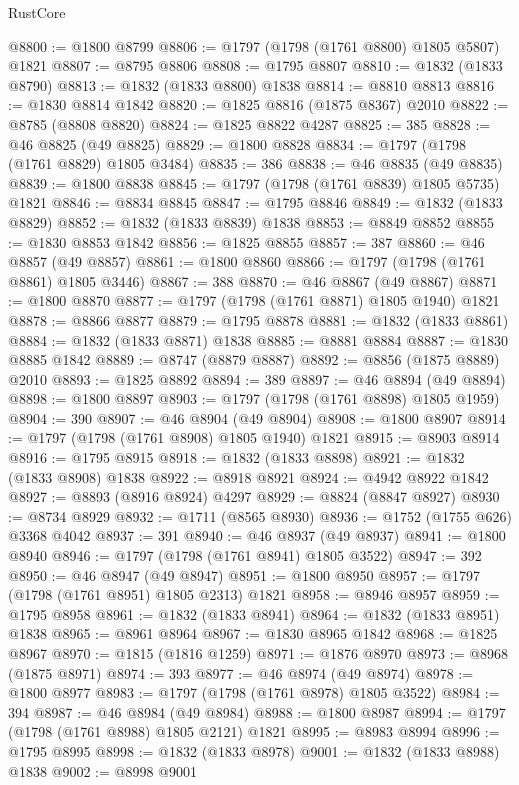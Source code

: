 \begin{lexlean}{RustCore}
\begin{coremodule}
@8800 := @1800 @8799
@8806 := @1797 (@1798 (@1761 @8800) @1805 @5807) @1821
@8807 := @8795 @8806
@8808 := @1795 @8807
@8810 := @1832 (@1833 @8790)
@8813 := @1832 (@1833 @8800) @1838
@8814 := @8810 @8813
@8816 := @1830 @8814 @1842
@8820 := @1825 @8816 (@1875 @8367) @2010
@8822 := @8785 (@8808 @8820)
@8824 := @1825 @8822 @4287
@8825 := 385
@8828 := @46 @8825 (@49 @8825)
@8829 := @1800 @8828
@8834 := @1797 (@1798 (@1761 @8829) @1805 @3484)
@8835 := 386
@8838 := @46 @8835 (@49 @8835)
@8839 := @1800 @8838
@8845 := @1797 (@1798 (@1761 @8839) @1805 @5735) @1821
@8846 := @8834 @8845
@8847 := @1795 @8846
@8849 := @1832 (@1833 @8829)
@8852 := @1832 (@1833 @8839) @1838
@8853 := @8849 @8852
@8855 := @1830 @8853 @1842
@8856 := @1825 @8855
@8857 := 387
@8860 := @46 @8857 (@49 @8857)
@8861 := @1800 @8860
@8866 := @1797 (@1798 (@1761 @8861) @1805 @3446)
@8867 := 388
@8870 := @46 @8867 (@49 @8867)
@8871 := @1800 @8870
@8877 := @1797 (@1798 (@1761 @8871) @1805 @1940) @1821
@8878 := @8866 @8877
@8879 := @1795 @8878
@8881 := @1832 (@1833 @8861)
@8884 := @1832 (@1833 @8871) @1838
@8885 := @8881 @8884
@8887 := @1830 @8885 @1842
@8889 := @8747 (@8879 @8887)
@8892 := @8856 (@1875 @8889) @2010
@8893 := @1825 @8892
@8894 := 389
@8897 := @46 @8894 (@49 @8894)
@8898 := @1800 @8897
@8903 := @1797 (@1798 (@1761 @8898) @1805 @1959)
@8904 := 390
@8907 := @46 @8904 (@49 @8904)
@8908 := @1800 @8907
@8914 := @1797 (@1798 (@1761 @8908) @1805 @1940) @1821
@8915 := @8903 @8914
@8916 := @1795 @8915
@8918 := @1832 (@1833 @8898)
@8921 := @1832 (@1833 @8908) @1838
@8922 := @8918 @8921
@8924 := @4942 @8922 @1842
@8927 := @8893 (@8916 @8924) @4297
@8929 := @8824 (@8847 @8927)
@8930 := @8734 @8929
@8932 := @1711 (@8565 @8930)
@8936 := @1752 (@1755 @626) @3368 @4042
@8937 := 391
@8940 := @46 @8937 (@49 @8937)
@8941 := @1800 @8940
@8946 := @1797 (@1798 (@1761 @8941) @1805 @3522)
@8947 := 392
@8950 := @46 @8947 (@49 @8947)
@8951 := @1800 @8950
@8957 := @1797 (@1798 (@1761 @8951) @1805 @2313) @1821
@8958 := @8946 @8957
@8959 := @1795 @8958
@8961 := @1832 (@1833 @8941)
@8964 := @1832 (@1833 @8951) @1838
@8965 := @8961 @8964
@8967 := @1830 @8965 @1842
@8968 := @1825 @8967
@8970 := @1815 (@1816 @1259)
@8971 := @1876 @8970
@8973 := @8968 (@1875 @8971)
@8974 := 393
@8977 := @46 @8974 (@49 @8974)
@8978 := @1800 @8977
@8983 := @1797 (@1798 (@1761 @8978) @1805 @3522)
@8984 := 394
@8987 := @46 @8984 (@49 @8984)
@8988 := @1800 @8987
@8994 := @1797 (@1798 (@1761 @8988) @1805 @2121) @1821
@8995 := @8983 @8994
@8996 := @1795 @8995
@8998 := @1832 (@1833 @8978)
@9001 := @1832 (@1833 @8988) @1838
@9002 := @8998 @9001

\end{coremodule}
\end{lexlean}
